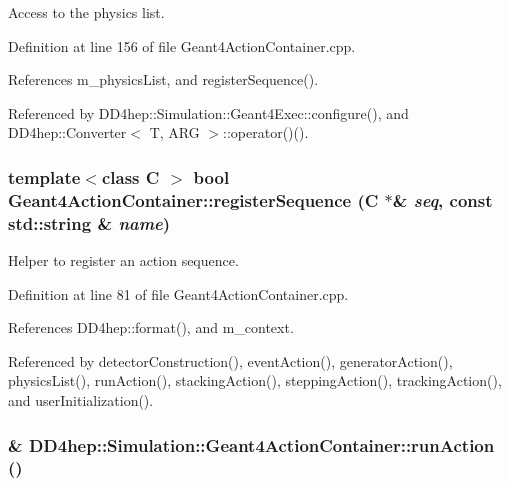 Access to the physics list. 

Definition at line 156 of file Geant4ActionContainer.cpp.

References m\_\-physicsList, and registerSequence().

Referenced by DD4hep::Simulation::Geant4Exec::configure(), and DD4hep::Converter$<$ T, ARG $>$::operator()().\hypertarget{class_d_d4hep_1_1_simulation_1_1_geant4_action_container_ac655fa04c6d264d5d4bcf69c2fd4963e}{
\subsubsection[{registerSequence}]{\setlength{\rightskip}{0pt plus 5cm}template$<$class C $>$ bool Geant4ActionContainer::registerSequence (C $\ast$\& {\em seq}, \/  const std::string \& {\em name})}}
\label{class_d_d4hep_1_1_simulation_1_1_geant4_action_container_ac655fa04c6d264d5d4bcf69c2fd4963e}


Helper to register an action sequence. 

Definition at line 81 of file Geant4ActionContainer.cpp.

References DD4hep::format(), and m\_\-context.

Referenced by detectorConstruction(), eventAction(), generatorAction(), physicsList(), runAction(), stackingAction(), steppingAction(), trackingAction(), and userInitialization().\hypertarget{class_d_d4hep_1_1_simulation_1_1_geant4_action_container_adff65baf436f870b8cc2e9ffd8844e7a}{
\subsubsection[{runAction}]{\& DD4hep::Simulation::Geant4ActionContainer::runAction ()}}
\label{class_d_d4hep_1_1_simulation_1_1_geant4_action_container_adff65baf436f870b8cc2e9ffd8844e7a}


